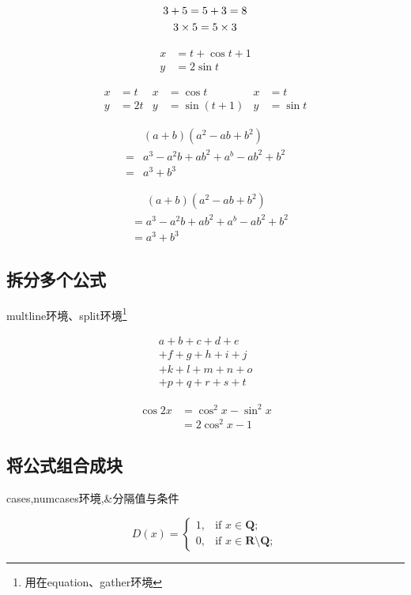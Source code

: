 \documentclass[titlepage, hyperref, UTF8]{ctexart}
\begin{document}
\begin{gather}
3+5=5+3=8  \\
3\times 5 = 5\times 3 \notag %
\end{gather}

\begin{align}
	x &= t+\cos t + 1\\
	y &= 2\sin t
\end{align}

\begin{align}
x &= t & x &= \cos t & x &= t\\
y &= 2t & y &= \sin (t+1) & y &= \sin t
\end{align}

\begin{align*}
	&(a+b)(a^2-ab+b^2) \\
={}& a^3-a^2b+ab^2+a^b
	 -ab^2+b^2\\
={}& a^3+b^3 \label{eq:cubenum}
\end{align*}

\begin{align*}
&\mathrel{\phantom{=}}
	(a+b)(a^2-ab+b^2) \\
&= a^3-a^2b+ab^2+a^b
	 -ab^2+b^2\\
&= a^3+b^3 %
\end{align*}

\subsection{拆分多个公式}
multline环境、split环境\footnote{用在equation、gather环境}

\begin{multline}
a+b+c+d+e\\
+f+g+h+i+j\\
+k+l+m+n+o\\
+p+q+r+s+t
\end{multline}

\begin{equation}
\begin{split}
\cos 2x &= \cos^2 x - \sin^2 x\\
		&= 2\cos^2x - 1 
\end{split}
\end{equation}
\subsection{将公式组合成块}
cases,numcases环境,\&分隔值与条件

\begin{equation}
D(x)=
\begin{cases}
1,&\text{if }x \in \mathbf{Q};\\
0,&\text{if }x \in \mathbf{R}\setminus\mathbf{Q};
\end{cases}
\end{equation}
\end{document}

